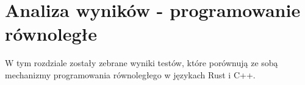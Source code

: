 \chapter{Analiza wyników - programowanie równoległe}
W tym rozdziale zostały zebrane wyniki testów, które porównują ze sobą mechanizmy programowania równoległego w językach Rust i C++.


